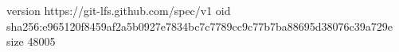 version https://git-lfs.github.com/spec/v1
oid sha256:e965120f8459af2a5b0927e7834bc7c7789cc9c77b7ba88695d38076c39a729e
size 48005
